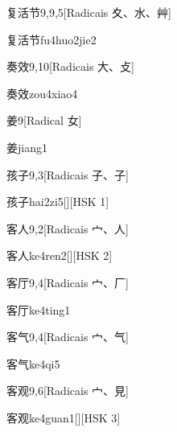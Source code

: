 \begin{entry}{复活节}{9,9,5}[Radicais ⼢、⽔、⾋]
  \begin{phonetics}{复活节}{fu4huo2jie2}
  \end{phonetics}
\end{entry}

\begin{entry}{奏效}{9,10}[Radicais ⼤、⽁]
  \begin{phonetics}{奏效}{zou4xiao4}
  \end{phonetics}
\end{entry}

\begin{entry}{姜}{9}[Radical ⼥]
  \begin{phonetics}{姜}{jiang1}
  \end{phonetics}
\end{entry}

\begin{entry}{孩子}{9,3}[Radicais ⼦、⼦]
  \begin{phonetics}{孩子}{hai2zi5}[][HSK 1]
  \end{phonetics}
\end{entry}

\begin{entry}{客人}{9,2}[Radicais ⼧、⼈]
  \begin{phonetics}{客人}{ke4ren2}[][HSK 2]
  \end{phonetics}
\end{entry}

\begin{entry}{客厅}{9,4}[Radicais ⼧、⼚]
  \begin{phonetics}{客厅}{ke4ting1}
  \end{phonetics}
\end{entry}

\begin{entry}{客气}{9,4}[Radicais ⼧、⽓]
  \begin{phonetics}{客气}{ke4qi5}
  \end{phonetics}
\end{entry}

\begin{entry}{客观}{9,6}[Radicais ⼧、⾒]
  \begin{phonetics}{客观}{ke4guan1}[][HSK 3]
  \end{phonetics}
\end{entry}

